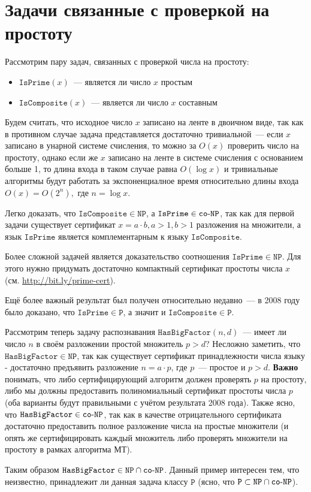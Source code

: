 \documentclass[
    11pt,
    a4paper
]{article}
\theoremstyle{definition}
\begin{document}
\section{Задачи связанные с проверкой на простоту}

Рассмотрим пару задач, связанных с проверкой числа на простоту:
\begin{itemize}
\item $\mathtt{IsPrime}(x)$~--- является ли число $x$ простым
\item $\mathtt{IsComposite}(x)$~--- является ли число $x$ составным
\end{itemize}

Будем считать, что исходное число $x$ записано на ленте в двоичном виде, так как в противном случае задача представляется достаточно тривиальной~--- если $x$ записано в унарной системе счисления, то можно за $O(x)$ проверить число на простоту, однако если же $x$ записано на ленте в системе счисления с основанием больше 1, то длина входа в таком случае равна $O(\log x)$ и тривиальные алгоритмы будут работать за экспоненциалное время относительно длины входа $O(x) = O(2^n), \text{ где } n = \log x$.

Легко доказать, что $\mathtt{IsComposite} \in \mathtt{NP}$, а $\mathtt{IsPrime} \in \mathtt{co{\text -}NP}$, так как для первой задачи существует сертификат $x = a \cdot b, a > 1, b > 1$ разложения на множители, а язык $\mathtt{IsPrime}$ является комплементарным к языку $\mathtt{IsComposite}$.

Более сложной задачей является доказательство соотношения $\mathtt{IsPrime} \in \mathtt{NP}$. Для этого нужно придумать достаточно компактный сертификат простоты числа $x$ (см. \url{http://bit.ly/prime-cert}).

Ещё более важный результат был получен относительно недавно~--- в 2008 году было доказано, что $\mathtt{IsPrime} \in \mathtt{P}$, а значит и $\mathtt{IsComposite} \in \mathtt{P}$.

Рассмотрим теперь задачу распознавания $\mathtt{HasBigFactor}(n, d)$~--- имеет ли число $n$ в своём разложении простой множитель $p > d$? Несложно заметить, что $\mathtt{HasBigFactor} \in \mathtt{NP}$, так как существует сертификат принадлежности числа языку - достаточно предъявить разложение $n = a \cdot p$, где $p$~--- простое и $p > d$. \textbf{Важно} понимать, что либо сертифицирующий алгоритм должен проверять $p$ на простоту, либо мы должны предоставить полиномиальный сертификат простоты числа $p$ (оба варианты будут правильными с учётом результата 2008 года). Также ясно, что $\mathtt{HasBigFactor} \in \mathtt{co{\text -}NP}$, так как в качестве отрицательного сертификата достаточно предоставить полное разложение числа на простые множители (и опять же сертифицировать каждый множитель либо проверять множители на простоту в рамках алгоритма МТ). 

Таким образом $\mathtt{HasBigFactor} \in \mathtt{NP} \cap \mathtt{co{\text -}NP}$. Данный пример интересен тем, что неизвестно, принадлежит ли данная задача классу $\mathtt{P}$ (ясно, что $\mathtt{P} \subset \mathtt{NP} \cap \mathtt{co{\text -}NP}$).
\end{document}
